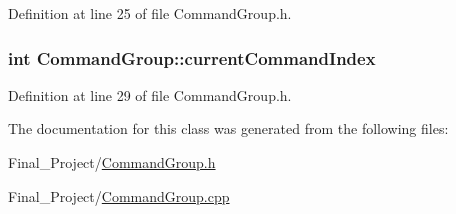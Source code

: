 Definition at line 25 of file Command\-Group.\-h.

\hypertarget{classCommandGroup_aeb8729b909aafeb23eafcfd0eec22c71}{
\subsubsection[{current\-Command\-Index}]{\setlength{\rightskip}{0pt plus 5cm}int Command\-Group\-::current\-Command\-Index\hspace{0.3cm}{\ttfamily [private]}}}\label{classCommandGroup_aeb8729b909aafeb23eafcfd0eec22c71}


Definition at line 29 of file Command\-Group.\-h.



The documentation for this class was generated from the following files\-:\begin{DoxyCompactItemize}
\item 
Final\-\_\-\-Project/\hyperlink{CommandGroup_8h}{Command\-Group.\-h}\item 
Final\-\_\-\-Project/\hyperlink{CommandGroup_8cpp}{Command\-Group.\-cpp}\end{DoxyCompactItemize}
